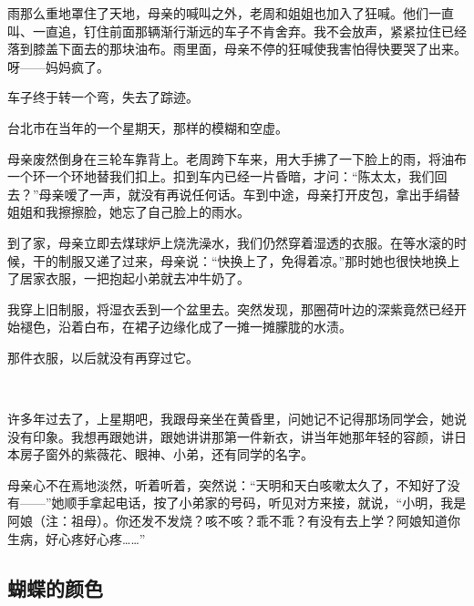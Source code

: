 \par 雨那么重地罩住了天地，母亲的喊叫之外，老周和姐姐也加入了狂喊。他们一直叫、一直追，钉住前面那辆渐行渐远的车子不肯舍弃。我不会放声，紧紧拉住已经落到膝盖下面去的那块油布。雨里面，母亲不停的狂喊使我害怕得快要哭了出来。呀——妈妈疯了。
\par 车子终于转一个弯，失去了踪迹。
\par 台北市在当年的一个星期天，那样的模糊和空虚。
\par 母亲废然倒身在三轮车靠背上。老周跨下车来，用大手拂了一下脸上的雨，将油布一个环一个环地替我们扣上。扣到车内已经一片昏暗，才问：“陈太太，我们回去？”母亲嗳了一声，就没有再说任何话。车到中途，母亲打开皮包，拿出手绢替姐姐和我擦擦脸，她忘了自己脸上的雨水。
\par 到了家，母亲立即去煤球炉上烧洗澡水，我们仍然穿着湿透的衣服。在等水滚的时候，干的制服又递了过来，母亲说：“快换上了，免得着凉。”那时她也很快地换上了居家衣服，一把抱起小弟就去冲牛奶了。
\par 我穿上旧制服，将湿衣丢到一个盆里去。突然发现，那圈荷叶边的深紫竟然已经开始褪色，沿着白布，在裙子边缘化成了一摊一摊朦胧的水渍。
\par 那件衣服，以后就没有再穿过它。
\par  
\par 许多年过去了，上星期吧，我跟母亲坐在黄昏里，问她记不记得那场同学会，她说没有印象。我想再跟她讲，跟她讲讲那第一件新衣，讲当年她那年轻的容颜，讲日本房子窗外的紫薇花、眼神、小弟，还有同学的名字。
\par 母亲心不在焉地淡然，听着听着，突然说：“天明和天白咳嗽太久了，不知好了没有——”她顺手拿起电话，按了小弟家的号码，听见对方来接，就说，“小明，我是阿娘（注：祖母）。你还发不发烧？咳不咳？乖不乖？有没有去上学？阿娘知道你生病，好心疼好心疼……”




\subsection{蝴蝶的颜色}

